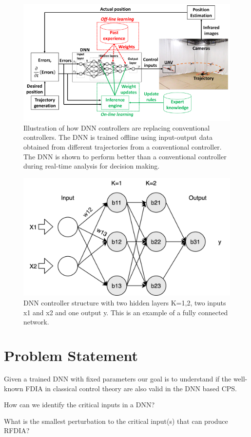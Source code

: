 \begin{figure}
	\centering
	\includegraphics[width=0.7\linewidth]{Images/DNNcontroller}
	\caption{Illustration of how DNN controllers are replacing conventional controllers. The DNN is trained offline using input-output data obtained from different trajectories from a conventional controller. The DNN is shown to perform better than a conventional controller during real-time analysis for decision making.}
	\label{fig:dnncontroller}
\end{figure}

\begin{figure}
	\centering
	\includegraphics[width=0.7\linewidth]{Images/DNNstructure}
	\caption[DNN structure]{DNN controller structure with two hidden layers K=1,2, two inputs x1 and x2 and one output y. This is an example of a fully connected network.}
	\label{fig:dnn-controller}
\end{figure}



\section{Problem Statement}

Given a trained DNN with fixed parameters our goal is to understand if the well-known \ac*{FDIA} in classical control theory are also valid in the DNN based CPS.
\begin{problem}
	How can we identify the critical inputs in a DNN?
\end{problem}

\begin{problem}
	What is the smallest perturbation to the critical input(s) that can produce \ac{RFDIA}?
\end{problem}




